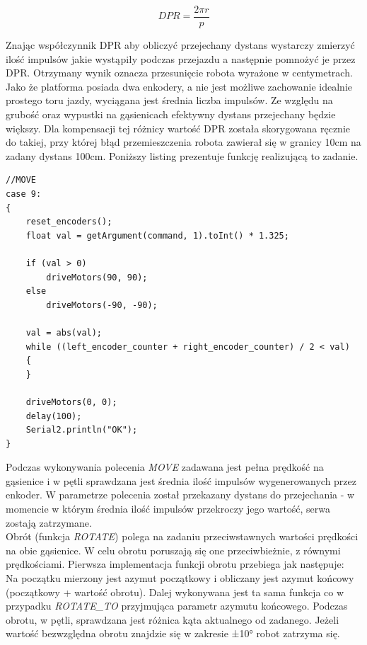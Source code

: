 \begin{equation}
    DPR = \frac{2 \pi r}{p}
\end{equation}

Znając współczynnik DPR aby obliczyć przejechany dystans wystarczy zmierzyć ilość impulsów jakie wystąpiły podczas przejazdu a następnie pomnożyć je przez DPR. Otrzymany wynik oznacza przesunięcie robota wyrażone w centymetrach. Jako że platforma posiada dwa enkodery, a nie jest możliwe zachowanie idealnie prostego toru jazdy, wyciągana jest średnia liczba impulsów. Ze względu na grubość oraz wypustki na gąsienicach efektywny dystans przejechany będzie większy. Dla kompensacji tej różnicy wartość DPR została skorygowana ręcznie do takiej, przy której błąd przemieszczenia robota zawierał się w granicy 10cm na zadany dystans 100cm. Poniższy listing prezentuje funkcję realizującą to zadanie.

\begin{lstlisting}[basicstyle=\footnotesize\ttfamily]
//MOVE
case 9:
{
    reset_encoders();
    float val = getArgument(command, 1).toInt() * 1.325;

    if (val > 0)
        driveMotors(90, 90);
    else
        driveMotors(-90, -90);

    val = abs(val);
    while ((left_encoder_counter + right_encoder_counter) / 2 < val)
    {
    }

    driveMotors(0, 0);
    delay(100);
    Serial2.println("OK");
}
\end{lstlisting}

Podczas wykonywania polecenia \emph{MOVE} zadawana jest pełna prędkość na gąsienice i w pętli sprawdzana jest średnia ilość impulsów wygenerowanych przez enkoder. W parametrze polecenia został przekazany dystans do przejechania - w momencie w którym średnia ilość impulsów przekroczy jego wartość, serwa zostają zatrzymane.
\\ 

Obrót (funkcja \emph{ROTATE}) polega na zadaniu przeciwstawnych wartości prędkości na obie gąsienice. W celu obrotu poruszają się one przeciwbieżnie, z równymi prędkościami. Pierwsza implementacja funkcji obrotu przebiega jak następuje:
\\

Na początku mierzony jest azymut początkowy i obliczany jest azymut końcowy (początkowy + wartość obrotu). Dalej wykonywana jest ta sama funkcja co w przypadku \emph{ROTATE\_TO} przyjmująca parametr azymutu końcowego. Podczas obrotu, w pętli, sprawdzana jest różnica kąta aktualnego od zadanego. Jeżeli wartość bezwzględna obrotu znajdzie się w zakresie ±10° robot zatrzyma się.

